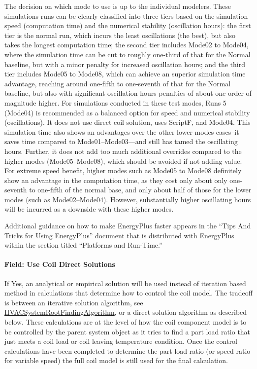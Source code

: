 The decision on which mode to use is up to the individual modelers. These simulations runs can be clearly classified into three tiers based on the simulation speed (computation time) and the numerical stability (oscillation hours): the first tier is the normal run, which incurs the least oscillations (the best), but also takes the longest computation time; the second tier includes Mode02 to Mode04, where the simulation time can be cut to roughly one-third of that for the Normal baseline, but with a minor penalty for increased oscillation hours; and the third tier includes Mode05 to Mode08, which can achieve an superior simulation time advantage, reaching around one-fifth to one-seventh of that for the Normal baseline, but also with significant oscillation hours penalties of about one order of magnitude higher. For simulations conducted in these test modes, Runs 5 (Mode04) is recommended as a balanced option for speed and numerical stability (oscillations). It does not use direct coil solution, uses ScriptF, and Mode04. This simulation time also shows an advantages over the other lower modes cases--it saves time compared to Mode01--Mode03---and still has tamed the oscillating hours. Further, it does not add too much additional overrides compared to the higher modes (Mode05--Mode08), which should be avoided if not adding value. For extreme speed benefit, higher modes such as Mode05 to Mode08 definitely show an advantage in the computation time, as they cost only about only one-seventh to one-fifth of the normal base, and only about half of those for the lower modes (such as Mode02--Mode04). However, substantially higher oscillating hours will be incurred as a downside with these higher modes.

Additional guidance on how to make EnergyPlus faster appears in the ``Tips And Tricks for Using EnergyPlus'' document that is distributed with EnergyPlus within the section titled ``Platforms and Run-Time.''

\paragraph{Field: Use Coil Direct Solutions}\label{use-coil-direct-solutions}

If Yes, an analytical or empirical solution will be used instead of iteration based method in calculations that determine how to control the coil model. The tradeoff is between an iterative solution algorithm, see \hyperref[hvacystemrootfindingalgorithm]{HVACSystemRootFindingAlgorithm}, or a direct solution algorithm as described below. These calculations are at the level of how the coil component model is to be controlled by the parent system object as it tries to find a part load ratio that just meets a coil load or coil leaving temperature condition. Once the control calculations have been completed to determine the part load ratio (or speed ratio for variable speed) the full coil model is still used for the final calculation.

